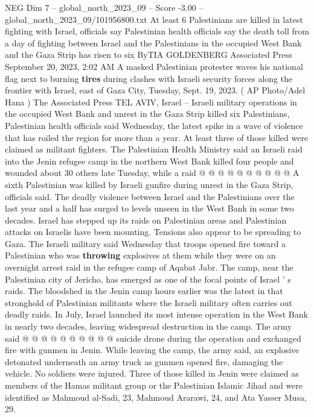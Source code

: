 \begin{textsample}{NEG Dim 7 – global\_north\_2023\_09 – Score -3.00 – global\_north\_2023\_09/101956800.txt}  \label{ex:f7_neg_169}
At least 6 Palestinians are killed in latest fighting with Israel, officials say Palestinian health officials say the death toll from a day of fighting between Israel and the Palestinians in the occupied West Bank and the Gaza Strip has risen to six ByTIA GOLDENBERG Associated Press September 20, 2023, 2:02 AM A masked Palestinian protester waves his national flag next to burning \textbf{tires} during clashes with Israeli security forces along the frontier with Israel, east of Gaza City, Tuesday, Sept. 19, 2023. ( AP Photo/Adel Hana ) The Associated Press TEL AVIV, Israel -- Israeli military operations in the occupied West Bank and unrest in the Gaza Strip killed six Palestinians, Palestinian health officials said Wednesday, the latest spike in a wave of violence that has roiled the region for more than a year.
At least three of those killed were claimed as militant fighters.
The Palestinian Health Ministry said an Israeli raid into the Jenin refugee camp in the northern West Bank killed four people and wounded about 30 others late Tuesday, while a raid @ @ @ @ @ @ @ @ @ @ A sixth Palestinian was killed by Israeli gunfire during unrest in the Gaza Strip, officials said.
The deadly violence between Israel and the Palestinians over the last year and a half has surged to levels unseen in the West Bank in some two decades.
Israel has stepped up its raids on Palestinian areas and Palestinian attacks on Israelis have been mounting.
Tensions also appear to be spreading to Gaza.
The Israeli military said Wednesday that troops opened fire toward a Palestinian who was \textbf{throwing} explosives at them while they were on an overnight arrest raid in the refugee camp of Aqabat Jabr.
The camp, near the Palestinian city of Jericho, has emerged as one of the focal points of Israel ' s raids.
The bloodshed in the Jenin camp hours earlier was the latest in that stronghold of Palestinian militants where the Israeli military often carries out deadly raids.
In July, Israel launched its most intense operation in the West Bank in nearly two decades, leaving widespread destruction in the camp.
The army said @ @ @ @ @ @ @ @ @ @ suicide drone during the operation and exchanged fire with gunmen in Jenin.
While leaving the camp, the army said, an explosive detonated underneath an army truck as gunmen opened fire, damaging the vehicle.
No soldiers were injured.
Three of those killed in Jenin were claimed as members of the Hamas militant group or the Palestinian Islamic Jihad and were identified as Mahmoud al-Sadi, 23, Mahmoud Ararawi, 24, and Ata Yasser Musa, 29.

\end{textsample}
